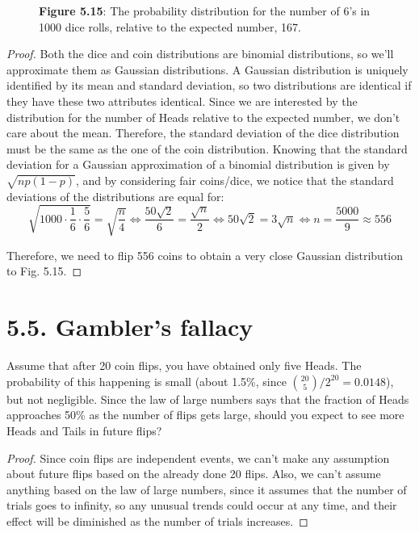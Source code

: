 \begin{figure}[H]
    \caption*{\textbf{Figure 5.15}: The probability distribution for the number of 6's in 1000
    dice rolls, relative to the expected number, 167.}
\end{figure}

\vspace{1em}

\begin{proof}
    Both the dice and coin distributions are binomial distributions, so we'll approximate
    them as Gaussian distributions. A Gaussian distribution is uniquely identified by its
    mean and standard deviation, so two distributions are identical if they have these
    two attributes identical. Since we are interested by the distribution 
    for the number of Heads relative to the expected number, we don't care about the mean.
    Therefore, the standard deviation of the dice distribution must be the same as the one
    of the coin distribution. Knowing that the standard deviation for a Gaussian approximation
    of a binomial distribution is given by $\sqrt{np(1 - p)}$, and by considering fair coins/dice,
    we notice that the standard deviations of the distributions are equal for:
    \[
        \sqrt{1000 \cdot \frac{1}{6} \cdot \frac{5}{6}} = \sqrt{\frac{n}{4}} 
        \iff \frac{50\sqrt{2}}{6} = \frac{\sqrt{n}}{2}
        \iff 50\sqrt{2} = 3\sqrt{n} \iff n = \frac{5000}{9} \approx 556
    \] 

    Therefore, we need to flip 556 coins to obtain a very close Gaussian distribution to
    Fig. 5.15.
\end{proof}

\section*{5.5. Gambler's fallacy}
Assume that after 20 coin flips, you have obtained only five Heads. The
probability of this happening is small (about 1.5\%, since $\binom{20}{5} / 2^{20} = 0.0148$),
but not negligible. Since the law of large numbers says that the fraction of Heads approaches
50\% as the number of flips gets large, should you expect to see more Heads and Tails in
future flips?

\vspace{1em}

\begin{proof}
    Since coin flips are independent events, we can't make any assumption about future flips
    based on the already done 20 flips. Also, we can't assume anything based on the law of large
    numbers, since it assumes that the number of trials goes to infinity, so any unusual trends could
    occur at any time, and their effect will be diminished as the number of trials increases. 
\end{proof}

